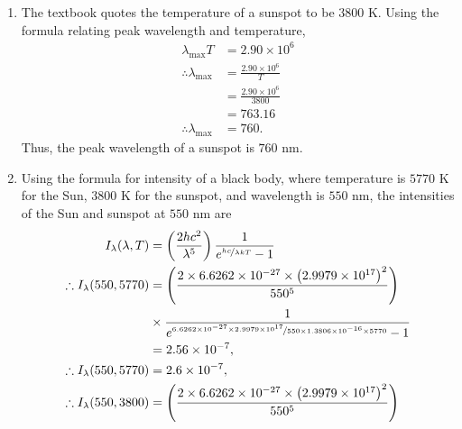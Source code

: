 \documentclass[a4paper,11pt]{article}
\newcommand{\ds}{\displaystyle}
\begin{document}
{{\begin{enumerate}[leftmargin=*]
\begin{enumerate}[label=\alph*)]
				\begin{align*}
					F & = \frac{L}{4\pi D^2} \\
					  & = \frac{4 \pi R^2}{4\pi D^2} \sigma_{\Sigma B} T^4 \\
					  & = \frac{696340^2}{\left(149.6\times 10^6\right)^2} \times 5.7 \times 10^{-5} \times (5770)^4 \\
					  & = 1.37 \times 10^6 \\
					\therefore F  & = 1.4 \times 10^6.
				\end{align*}
				Thus, the flux energy from the Sun received at Earth is $\ds{1.4 \times 10^6}$ ergs/$\ds{\text{cm}^2}$/s.
			\item The textbook quotes the temperature of a sunspot to be $\ds{3800}$ K. Using the formula relating peak wavelength and temperature, 
				\begin{align*}
					\lambda_{\text{max}} T & = 2.90 \times 10^6 \\
					\therefore \lambda_{\text{max}} & = \frac{2.90 \times 10^6}{T} \\
													& = \frac{2.90 \times 10^6}{3800} \\
													& = 763.16 \\
					\therefore \lambda_{\text{max}} & = 760.
				\end{align*}
				Thus, the peak wavelength of a sunspot is $\ds{760}$ nm.
				\pagebreak
			\item Using the formula for intensity of a black body, where temperature is $\ds{5770}$ K for the Sun, $\ds{3800}$ K for the sunspot, and wavelength is $\ds{550}$ nm, the intensities of the Sun and sunspot at $\ds{550}$ nm are
				\begin{align*}
					I_{\lambda}(\lambda,T) & = \left(\frac{2hc^2}{\lambda^5}\right)\frac{1}{e^{\nicefrac{hc}{\lambda kT}} - 1} \\
					\therefore I_{\lambda}(550,5770) & = \left(\frac{2\times 6.6262\times 10^{-27} \times \left(2.9979\times 10^{17}\right)^2}{550^5}\right) \\
										  & \times \frac{1}{e^{\nicefrac{6.6262\times 10^{-27}\times 2.9979\times 10^{17}}{550\times  1.3806 \times 10^{-16} \times 5770}} - 1} \\
										  & = 2.56 \times 10^{-7}, \\
					\therefore I_{\lambda}(550,5770) & = 2.6 \times 10^{-7}, \\
					\therefore I_{\lambda}(550,3800) & = \left(\frac{2\times 6.6262\times 10^{-27} \times \left(2.9979\times 10^{17}\right)^2}{550^5}\right) \\

\end{align*}
\end{enumerate}
\end{enumerate}}}
\end{document}
